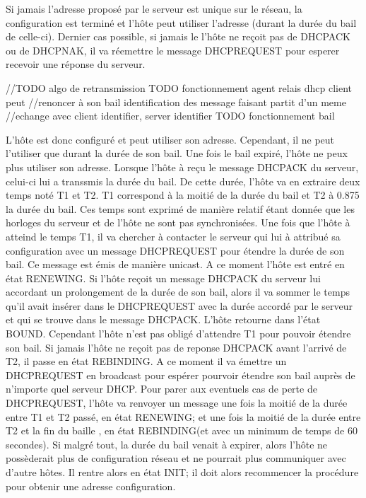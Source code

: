 Si jamais l'adresse proposé par le serveur est unique sur le réseau, la
configuration est terminé et l'hôte peut utiliser l'adresse (durant la durée du
bail de celle-ci).  Dernier cas possible, si jamais le l'hôte ne reçoit pas de
DHCPACK ou de DHCPNAK, il va réemettre le message DHCPREQUEST pour esperer
recevoir une réponse du serveur.

//TODO algo de retransmission TODO fonctionnement agent relais dhcp client peut
//renoncer à son bail identification des message faisant partit d'un meme
//echange avec client identifier, server identifier TODO fonctionnement bail

L'hôte est donc configuré et peut utiliser son adresse. Cependant, il ne peut
l'utiliser que durant la durée de son bail. Une fois le bail expiré, l'hôte ne
peux plus utiliser son adresse. Lorsque l'hôte à reçu le message DHCPACK du
serveur, celui-ci lui a transsmis la durée du bail. De cette durée, l'hôte va
en extraire deux temps noté T1 et T2. T1 correspond à la moitié de la durée du
bail et T2 à 0.875 la durée du bail. Ces temps sont exprimé de manière relatif
étant donnée que les horloges du serveur et de l'hôte ne sont pas
synchronisées.  Une fois que l'hôte à atteind le temps T1, il va chercher à
contacter le serveur qui lui à attribué sa configuration avec un message
DHCPREQUEST pour étendre la durée de son bail. Ce message est émis de manière
unicast. A ce moment l'hôte est entré en état RENEWING. Si l'hôte reçoit un
message DHCPACK du serveur lui accordant un prolongement de la durée de son
bail, alors il va sommer le temps qu'il avait insérer dans le DHCPREQUEST avec
la durée accordé par le serveur et qui se trouve dans le message DHCPACK.
L'hôte retourne dans l'état BOUND. Cependant l'hôte n'est pas obligé d'attendre
T1 pour pouvoir étendre son bail.  Si jamais l'hôte ne reçoit pas de reponse
DHCPACK avant l'arrivé de T2, il passe en état REBINDING. A ce moment il va
émettre un DHCPREQUEST en broadcast pour espérer pourvoir étendre son bail
auprès de n'importe quel serveur DHCP. Pour parer aux eventuels cas de perte de
DHCPREQUEST, l'hôte va renvoyer un message une fois la moitié de la durée entre
T1 et T2 passé, en état RENEWING; et une fois la moitié de la durée entre T2 et
la fin du baille , en état REBINDING(et avec un minimum de temps de 60
secondes).  Si malgré tout, la durée du bail venait à expirer, alors l'hôte ne
possèderait plus de configuration réseau et ne pourrait plus communiquer avec
d'autre hôtes. Il rentre alors en état INIT; il doit alors recommencer la
procédure pour obtenir une adresse configuration.

